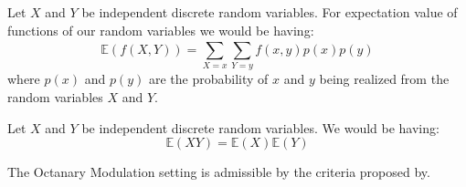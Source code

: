 \begin{Thm}\label{theorem:expectation_general}
  Let $X$ and $Y$ be independent discrete random variables. For expectation value of functions of our random variables we would be having:
\begin{equation}
  \mathbb{E}(f(X,Y)) = \sum_{X=x}^{}\sum_{Y=y}^{}f(x,y)p(x)p(y)
\end{equation}
  where $p(x)$ and $p(y)$ are the probability of $x$ and $y$ being realized from the random variables $X$ and $Y$.
\end{Thm}
\begin{Lem}\label{lemma:expectation_multiplication}
Let $X$ and $Y$ be independent discrete random variables. We would be having:
\begin{equation}
  \mathbb{E}(XY) = \mathbb{E}(X)\mathbb{E}(Y)
\end{equation}
\end{Lem}

\begin{Prop}
	The Octanary Modulation setting is admissible by the criteria proposed by\cite{Candes2014}. 
\end{Prop}

